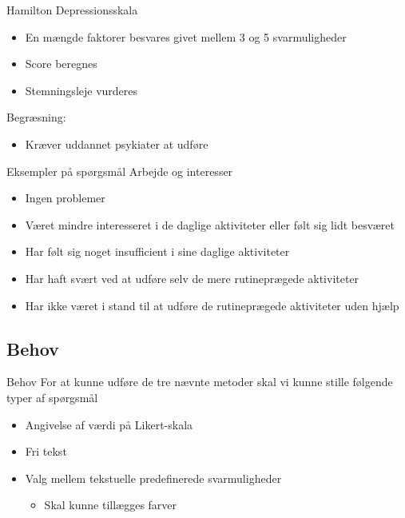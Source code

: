 { %
\begin{frame}{Hamilton Depressionsskala} %
	\begin{itemize}
		\item En mængde faktorer besvares givet mellem 3 og 5 svarmuligheder
		\item Score beregnes
		\item Stemningsleje vurderes
	\end{itemize}
	
	Begræsning:
	\begin{itemize}
		\item Kræver uddannet psykiater at udføre
	\end{itemize}
	
\end{frame}}
	
{ %
	\begin{frame}{Eksempler på spørgsmål} %
		 Arbejde og interesser
		\begin{itemize}
			\item Ingen problemer
			\item Været mindre interesseret i de daglige aktiviteter eller følt sig lidt besværet
			\item Har følt sig noget insufficient i sine daglige aktiviteter
			\item Har haft svært ved at udføre selv de mere rutineprægede aktiviteter
			\item Har ikke været i stand til at udføre de rutineprægede aktiviteter uden hjælp
		\end{itemize}
		
	\end{frame}}

\subsection{Behov}
{ %
\begin{frame}{Behov} %
For at kunne udføre de tre nævnte metoder skal vi kunne stille følgende typer af spørgsmål


\begin{itemize}
	\item Angivelse af værdi på Likert-skala
	\item Fri tekst
	\item Valg mellem tekstuelle predefinerede svarmuligheder
	\begin{itemize}
		\item Skal kunne tillægges farver
	\end{itemize}
\end{itemize}
\end{frame}}

